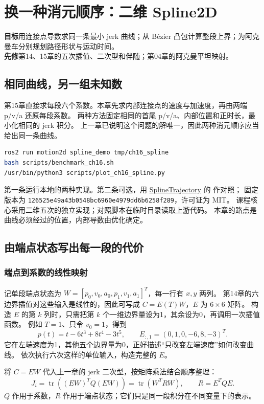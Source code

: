 \chapter{换一种消元顺序：二维 Spline2D}
\begin{notebox}
\textbf{目标}\quad 用连接点导数求同一条最小 jerk 曲线；从 Bézier 凸包计算整段上界；为阿克曼车分别规划路径形状与运动时间。\\
\textbf{先修}\quad 第14、15章的五次插值、二次型和伴随；第04章的阿克曼平坦映射。
\end{notebox}

\section{相同曲线，另一组未知数}
第15章直接求每段六个系数。本章先求内部连接点的速度与加速度，再由两端 p/v/a 还原每段系数。
两种方法固定相同的首尾 p/v/a、内部位置和正时长，最小化相同的 jerk 积分。
上一章已说明这个问题的解唯一，因此两种消元顺序应当给出同一条曲线。
\begin{lstlisting}[language=bash]
ros2 run motion2d spline_demo tmp/ch16_spline
bash scripts/benchmark_ch16.sh
/usr/bin/python3 scripts/plot_ch16_spline.py
\end{lstlisting}
第一条运行本地的两种实现。第二条可选，用
\href{https://github.com/Bziyue/SplineTrajectory}{SplineTrajectory} 的  作对照；
固定版本为 \texttt{126525e49a43b0548bc6960e4979dd6b6258f289}，许可证为 MIT。
课程核心采用二维五次的独立实现；对照脚本在临时目录读取上游代码。
本章的路点是曲线必须经过的位置，内部导数由优化确定。

\section{由端点状态写出每一段的代价}
\subsection{端点到系数的线性映射}
记单段端点状态为 $W=[p_0,v_0,a_0,p_1,v_1,a_1]^T$，每一行有 $x,y$ 两列。
第14章的六边界插值对这些输入是线性的，因此可写成 $C=E(T)W$，$E$ 为 $6\times6$ 矩阵。
构造 $E$ 的第 $k$ 列时，只需把第 $k$ 个一维边界量设为1，其余设为0，再调用一次插值函数。
例如 $T=1$、只令 $v_0=1$，得到
\[
 p(t)=t-6t^3+8t^4-3t^5,\qquad E_{:,1}=(0,1,0,-6,8,-3)^T.
\]
它在左端速度为1，其他五个边界量为0，正好描述“只改变左端速度”如何改变曲线。
 依次执行六次这样的单位输入，构造完整的 $E$。

将 $C=EW$ 代入上一章的 jerk 二次型，按矩阵乘法结合顺序整理：
\[
 J_i=\operatorname{tr}((EW)^TQ(EW))
    =\operatorname{tr}(W^TRW),\qquad R=E^TQE.
\]
$Q$ 作用于系数，$R$ 作用于端点状态；它们只是同一段积分在不同变量下的表示。

